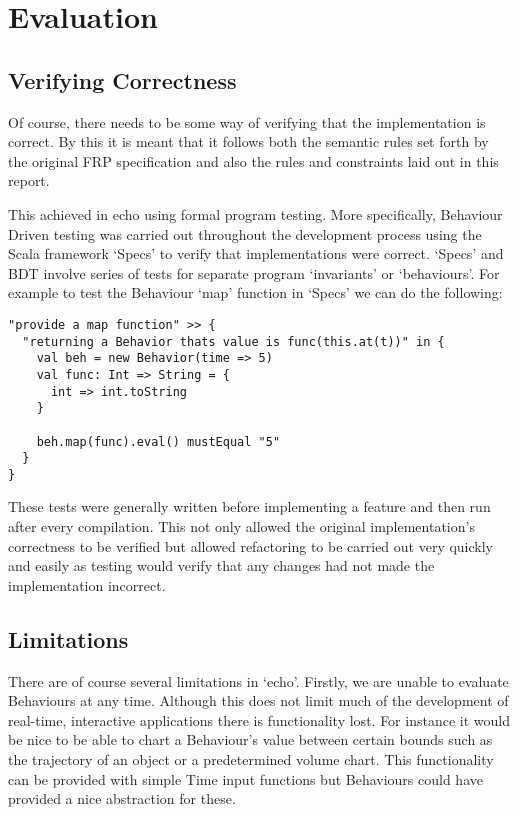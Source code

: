 \chapter{Evaluation}
  
  \section{Verifying Correctness}
    Of course, there needs to be some way of verifying that the implementation is correct. By
    this it is meant that it follows both the semantic rules set forth by the original FRP specification
    and also the rules and constraints laid out in this report.
  
    This achieved in echo using formal program testing. More specifically, Behaviour Driven
    testing was carried out throughout the development process using the Scala framework `Specs' \cite{EricTorreborre}
    to verify that implementations were correct. `Specs' and BDT involve series of tests for
    separate program `invariants' or `behaviours'. For example to test the Behaviour `map' function
    in `Specs' we can do the following:

\begin{verbatim}
"provide a map function" >> {
  "returning a Behavior thats value is func(this.at(t))" in {
    val beh = new Behavior(time => 5)
    val func: Int => String = {
      int => int.toString
    }

    beh.map(func).eval() mustEqual "5"
  }
}
\end{verbatim}      

    These tests were generally written before implementing a feature and then run after every compilation. 
    This not only allowed the original implementation's correctness to be verified but
    allowed refactoring to be carried out very quickly and easily as testing would verify that any changes had not
    made the implementation incorrect.
    
  \section{Limitations}
    There are of course several limitations in `echo'. Firstly, we are unable to evaluate Behaviours at any time.
    Although this does not limit much of the development of real-time, interactive applications there is functionality
    lost. For instance it would be nice to be able to chart a Behaviour's value between certain bounds such as
    the trajectory of an object or a predetermined volume chart. This functionality can be provided with simple
    Time input functions but Behaviours could have provided a nice abstraction for these.
    
